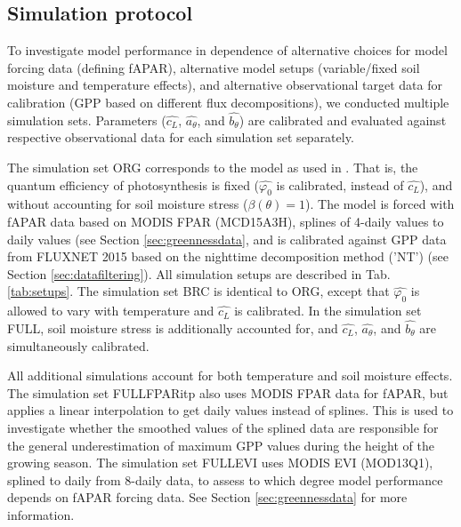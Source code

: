\documentclass{myreport}
\begin{document}
\subsection{Simulation protocol}
\label{sec:protocol}
To investigate model performance in dependence of alternative choices for model forcing data (defining fAPAR), alternative model setups (variable/fixed soil moisture and temperature effects), and alternative observational target data for calibration (GPP based on different flux decompositions), we conducted multiple simulation sets. Parameters ($\widehat{c_L}$, $\widehat{a_{\theta}}$, and $\widehat{b_{\theta}}$) are calibrated and evaluated against respective observational data for each simulation set separately.

The simulation set ORG corresponds to the model as used in \cite{wang17natpl}. That is, the quantum efficiency of photosynthesis is fixed ($\widehat{\varphi_0}$ is calibrated, instead of $\widehat{c_L}$), and without accounting for soil moisture stress ($\beta (\theta)=1$). The model is forced with fAPAR data based on MODIS FPAR (MCD15A3H), splines of 4-daily values to daily values (see Section \ref{sec:greennessdata}, and is calibrated against GPP data from FLUXNET 2015 based on the nighttime decomposition method ('NT') (see Section \ref{sec:datafiltering}). All simulation setups are described in Tab. \ref{tab:setups}. The simulation set BRC is identical to ORG, except that  $\widehat{\varphi_0}$ is allowed to vary with temperature and $\widehat{c_L}$ is calibrated. In the simulation set FULL, soil moisture stress is additionally accounted for, and $\widehat{c_L}$, $\widehat{a_{\theta}}$, and $\widehat{b_{\theta}}$ are simultaneously calibrated.

All additional simulations account for both temperature and soil moisture effects. The simulation set FULL\textunderscore FPARitp also uses MODIS FPAR data for fAPAR, but applies a linear interpolation to get daily values instead of splines. This is used to investigate whether the smoothed values of the splined data are responsible for the general underestimation of maximum GPP values during the height of the growing season. The simulation set FULL\textunderscore EVI uses MODIS EVI (MOD13Q1), splined to daily from 8-daily data, to assess to which degree model performance depends on fAPAR forcing data. See Section \ref{sec:greennessdata} for more information.
\end{document}

